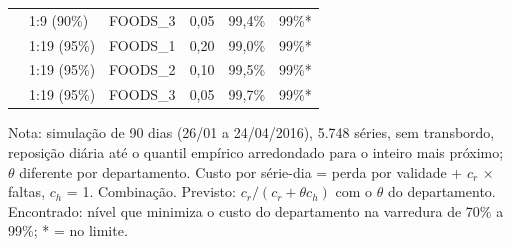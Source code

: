 \begin{table}[htbp]
\begin{tabular}{lllrrr}
 & 1:9 (90\%) & FOODS\_3 & 0,05 & 99,4\% & 99\%* \\
 & 1:19 (95\%) & FOODS\_1 & 0,20 & 99,0\% & 99\%* \\
 & 1:19 (95\%) & FOODS\_2 & 0,10 & 99,5\% & 99\%* \\
 & 1:19 (95\%) & FOODS\_3 & 0,05 & 99,7\% & 99\%* \\
\bottomrule
\end{tabular}
\par\smallskip
{\footnotesize Nota: simulação de 90 dias (26/01 a 24/04/2016), 5.748 séries, sem transbordo, reposição diária até o quantil empírico arredondado para o inteiro mais próximo; $\theta$ diferente por departamento. Custo por série-dia = perda por validade + $c_r$ × faltas, $c_h$ = 1. Combinação. Previsto: $c_r / (c_r + \theta c_h)$ com o $\theta$ do departamento. Encontrado: nível que minimiza o custo do departamento na varredura de 70\% a 99\%; * = no limite.}
\end{table}

